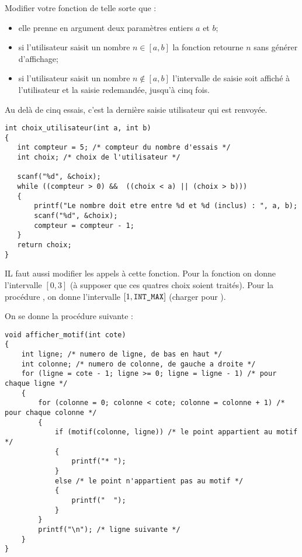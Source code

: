 \begin{lastenu}
\begin{correction}
 \end{correction}
\item Modifier votre fonction  de telle sorte
  que :
  \begin{itemize}
  \item elle prenne en argument deux paramètres entiers $a$ et $b$;
  \item si l'utilisateur saisit un nombre $n\in [a, b]$ la fonction
    retourne $n$ sans générer d'affichage;
\item si l'utilisateur saisit un nombre $n\not\in [a, b]$ l'intervalle
  de saisie soit affiché à l'utilisateur et la saisie redemandée,
  jusqu'à cinq fois.
  \end{itemize}

    \begin{correction}
Au delà de cinq essais, c'est la dernière saisie utilisateur qui est renvoyée.
{\footnotesize
\begin{verbatim}
int choix_utilisateur(int a, int b)
{
   int compteur = 5; /* compteur du nombre d'essais */
   int choix; /* choix de l'utilisateur */

   scanf("%d", &choix);
   while ((compteur > 0) &&  ((choix < a) || (choix > b)))
   {
       printf("Le nombre doit etre entre %d et %d (inclus) : ", a, b);
       scanf("%d", &choix);
       compteur = compteur - 1;
   }
   return choix;
}
\end{verbatim}
}
IL faut aussi modifier les appels à cette fonction. Pour la fonction  on donne l'intervalle $[0, 3]$ (à supposer que ces quatres choix soient traités). Pour la procédure , on donne l'intervalle $[1, \text{{\upshape\texttt{INT\_MAX}}}]$ (charger  pour ).
    \end{correction}

\end{lastenu}

On se donne la procédure suivante :
{\footnotesize
\begin{verbatim}
void afficher_motif(int cote)
{
    int ligne; /* numero de ligne, de bas en haut */
    int colonne; /* numero de colonne, de gauche a droite */
    for (ligne = cote - 1; ligne >= 0; ligne = ligne - 1) /* pour chaque ligne */
    {
        for (colonne = 0; colonne < cote; colonne = colonne + 1) /* pour chaque colonne */
        {
            if (motif(colonne, ligne)) /* le point appartient au motif */
            {
                printf("* ");  
            }
            else /* le point n'appartient pas au motif */
            {
                printf("  "); 
            }   
        }
        printf("\n"); /* ligne suivante */
    }
}
\end{verbatim}
}

